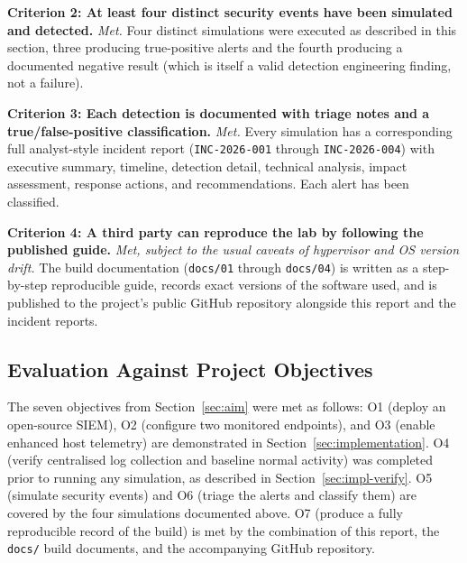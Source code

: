 \textbf{Criterion 2: At least four distinct security events have been
simulated and detected.} \textit{Met.} Four distinct simulations were
executed as described in this section, three producing true-positive alerts
and the fourth producing a documented negative result (which is itself a
valid detection engineering finding, not a failure).

\textbf{Criterion 3: Each detection is documented with triage notes and a
true/false-positive classification.} \textit{Met.} Every simulation has a
corresponding full analyst-style incident report
(\texttt{INC-2026-001} through \texttt{INC-2026-004}) with executive
summary, timeline, detection detail, technical analysis, impact assessment,
response actions, and recommendations. Each alert has been classified.

\textbf{Criterion 4: A third party can reproduce the lab by following the
published guide.} \textit{Met, subject to the usual caveats of hypervisor
and OS version drift.} The build documentation (\texttt{docs/01} through
\texttt{docs/04}) is written as a step-by-step reproducible guide, records
exact versions of the software used, and is published to the project's
public GitHub repository alongside this report and the incident reports.

\subsection{Evaluation Against Project Objectives}

The seven objectives from Section~\ref{sec:aim} were met as follows: O1
(deploy an open-source SIEM), O2 (configure two monitored endpoints), and
O3 (enable enhanced host telemetry) are demonstrated in
Section~\ref{sec:implementation}. O4 (verify centralised log collection and
baseline normal activity) was completed prior to running any simulation, as
described in Section~\ref{sec:impl-verify}. O5 (simulate security events)
and O6 (triage the alerts and classify them) are covered by the four
simulations documented above. O7 (produce a fully reproducible record of
the build) is met by the combination of this report, the \texttt{docs/}
build documents, and the accompanying GitHub repository.
